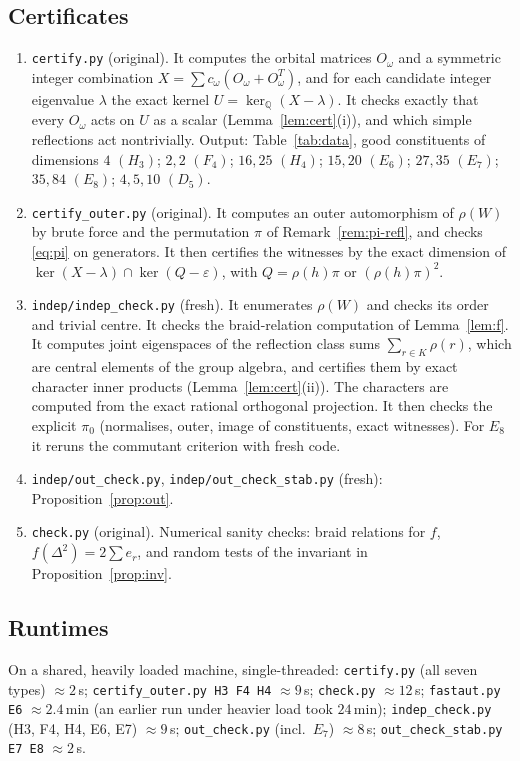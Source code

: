 \documentclass[11pt]{amsart}
\theoremstyle{definition}
\newcommand{\Q}{\mathbb{Q}}
\begin{document}
\subsection{Certificates}
\begin{enumerate}[label=(\arabic*)]
\item \texttt{certify.py} (original). It computes the orbital matrices $O_\omega$ and a symmetric integer
combination $X=\sum c_\omega(O_\omega+O_\omega^{T})$, and for each candidate integer eigenvalue $\lambda$ the exact
kernel $U=\ker_\Q(X-\lambda)$. It checks exactly that every $O_\omega$ acts on $U$ as a scalar
(Lemma~\ref{lem:cert}(i)), and which simple reflections act nontrivially. Output: Table~\ref{tab:data}, good
constituents of dimensions $4$ $(H_3)$; $2,2$ $(F_4)$; $16,25$ $(H_4)$; $15,20$ $(E_6)$; $27,35$ $(E_7)$; $35,84$
$(E_8)$; $4,5,10$ $(D_5)$.
\item \texttt{certify\_outer.py} (original). It computes an outer automorphism of $\rho(W)$ by brute force and the
permutation $\pi$ of Remark~\ref{rem:pi-refl}, and checks \eqref{eq:pi} on generators. It then certifies the
witnesses by the exact dimension of $\ker(X-\lambda)\cap\ker(Q-\varepsilon)$, with $Q=\rho(h)\pi$ or $(\rho(h)\pi)^2$.
\item \texttt{indep/indep\_check.py} (fresh). It enumerates $\rho(W)$ and checks its order and trivial centre. It
checks the braid-relation computation of Lemma~\ref{lem:f}. It computes joint eigenspaces of the reflection class
sums $\sum_{r\in K}\rho(r)$, which are central elements of the group algebra, and certifies them by exact
character inner products (Lemma~\ref{lem:cert}(ii)). The characters are computed from the exact rational
orthogonal projection. It then checks the explicit $\pi_0$ (normalises, outer, image of constituents, exact
witnesses). For $E_8$ it reruns the commutant criterion with fresh code.
\item \texttt{indep/out\_check.py}, \texttt{indep/out\_check\_stab.py} (fresh): Proposition~\ref{prop:out}.
\item \texttt{check.py} (original). Numerical sanity checks: braid relations for $f$, $f(\Delta^2)=2\sum e_r$, and
random tests of the invariant in Proposition~\ref{prop:inv}.
\end{enumerate}

\subsection{Runtimes}
On a shared, heavily loaded machine, single-threaded: \texttt{certify.py} (all seven types) $\approx 2$\,s;
\texttt{certify\_outer.py H3 F4 H4} $\approx 9$\,s; \texttt{check.py} $\approx12$\,s; \texttt{fastaut.py E6}
$\approx 2.4$\,min (an earlier run under heavier load took $24$\,min); \texttt{indep\_check.py} (H3, F4, H4, E6, E7)
$\approx 9$\,s; \texttt{out\_check.py} (incl.\ $E_7$) $\approx 8$\,s; \texttt{out\_check\_stab.py E7 E8}
$\approx 2$\,s.
\end{document}
